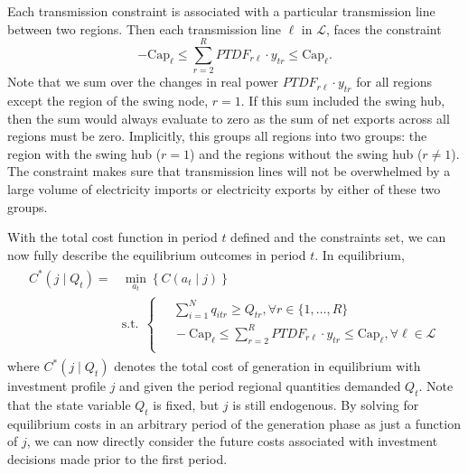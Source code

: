 Each transmission constraint is associated with a particular transmission line between two regions. Then each transmission line $\ell$ in $\mathcal{L}$, faces the constraint
\begin{equation}
    - \text{Cap}_\ell \leq \sum_{r=2}^R PTDF_{r\ell} \cdot y_{tr} \leq \text{Cap}_\ell.
\end{equation}
Note that we sum over the changes in real power $PTDF_{r\ell} \cdot y_{tr}$ for all regions except the region of the swing node, $r= 1$. If this sum included the swing hub, then the sum would always evaluate to zero as the sum of net exports across all regions must be zero. Implicitly, this groups all regions into two groups: the region with the swing hub ($r = 1$) and the regions without the swing hub ($r \neq 1$). The constraint makes sure that transmission lines will not be overwhelmed by a large volume of electricity imports or electricity exports by either of these two groups. 

With the total cost function in period $t$ defined and the constraints set, we can now fully describe the equilibrium outcomes in period $t$. 
In equilibrium, 
\begin{align}
\begin{split} \label{C_star}
    C^*(j\mid Q_{t}) = &\min_{a_t}  \left\{ C(a_t\mid j)\right\} \\
    &\text{s.t.} ~~\begin{cases}
        \quad \displaystyle\sum_{i=1}^N q_{itr} \geq Q_{tr}, \forall r \in \{1, \ldots, R\}\\
        \quad - \text{Cap}_\ell \leq \displaystyle\sum_{r=2}^R PTDF_{r\ell} \cdot y_{tr} \leq \text{Cap}_\ell, \forall \ell \in \mathcal{L}\\
    \end{cases}
\end{split}
\end{align}
where $C^*(j\mid Q_{t})$ denotes the total cost of generation in equilibrium with investment profile $j$ and given the period regional quantities demanded $Q_t$. Note that the state variable $Q_t$ is fixed, but $j$ is still endogenous. By solving for equilibrium costs in an arbitrary period of the generation phase as just a function of $j$, we can now directly consider the future costs associated with investment decisions made prior to the first period.



